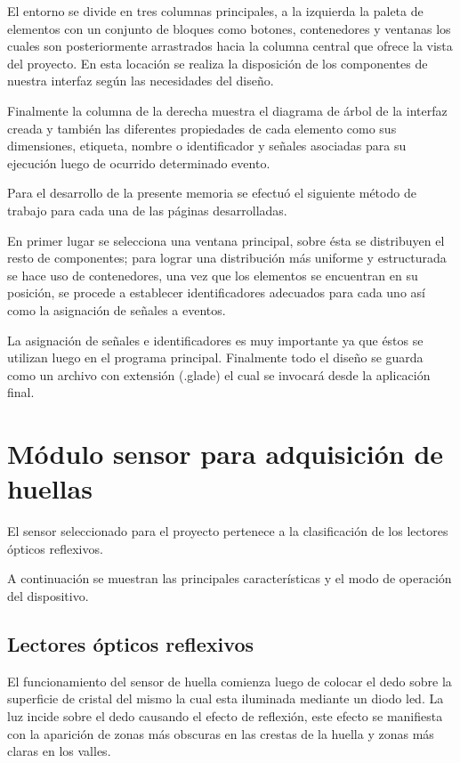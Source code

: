 El entorno se divide en tres columnas principales, a la izquierda la paleta de elementos con un conjunto de bloques como botones, contenedores y ventanas los cuales son posteriormente arrastrados hacia la columna central que ofrece la vista del proyecto. En esta locación se realiza la disposición de los componentes de nuestra interfaz según las necesidades del diseño.

Finalmente la columna de la derecha muestra el diagrama de árbol de la interfaz creada y también las diferentes propiedades de cada elemento como sus dimensiones, etiqueta, nombre o identificador y señales asociadas para su ejecución luego de ocurrido determinado evento.

Para el desarrollo de la presente memoria se efectuó el siguiente método de trabajo para cada una de las páginas desarrolladas. 

En primer lugar se selecciona una ventana principal, sobre ésta se distribuyen el resto de componentes; para lograr una distribución más uniforme y estructurada se hace uso de contenedores, una vez que los elementos se encuentran en su posición, se procede a establecer identificadores adecuados para cada uno así como la asignación de señales a eventos. 

La asignación de señales e identificadores es muy importante ya que éstos se utilizan luego en el programa principal.
Finalmente todo el diseño se guarda como un archivo con extensión (.glade) el cual se invocará desde la aplicación final.

\section{Módulo sensor para adquisición de huellas}
El sensor seleccionado para el proyecto pertenece a la clasificación de los lectores ópticos reflexivos. 

A continuación se muestran las principales características y el modo de operación del dispositivo.

\subsection{Lectores ópticos reflexivos}
El funcionamiento del sensor  de huella comienza luego de  colocar el dedo sobre la superficie de cristal del mismo la cual esta iluminada mediante un diodo led. La luz incide sobre el dedo causando el efecto de reflexión, este efecto se manifiesta con la aparición de zonas más obscuras en las crestas de la huella y zonas más claras en los valles.

